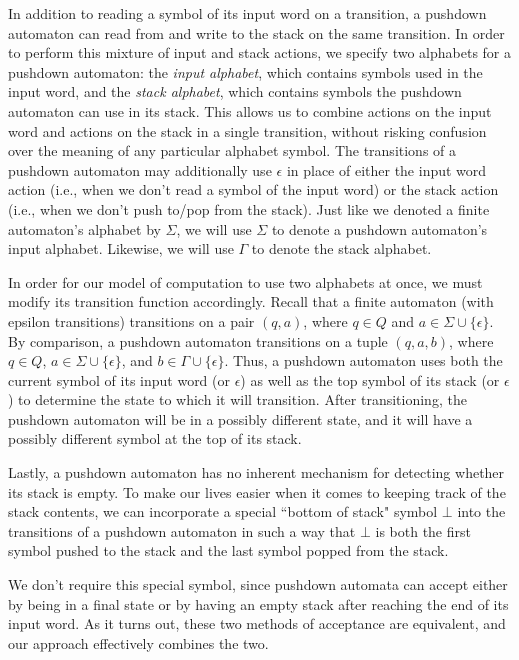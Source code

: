 In addition to reading a symbol of its input word on a transition, a pushdown automaton can read from and write to the stack on the same transition. In order to perform this mixture of input and stack actions, we specify two alphabets for a pushdown automaton: the \emph{input alphabet}, which contains symbols used in the input word, and the \emph{stack alphabet}, which contains symbols the pushdown automaton can use in its stack. This allows us to combine actions on the input word and actions on the stack in a single transition, without risking confusion over the meaning of any particular alphabet symbol. The transitions of a pushdown automaton may additionally use $\epsilon$ in place of either the input word action (i.e., when we don't read a symbol of the input word) or the stack action (i.e., when we don't push to/pop from the stack). Just like we denoted a finite automaton's alphabet by $\Sigma$, we will use $\Sigma$ to denote a pushdown automaton's input alphabet. Likewise, we will use $\Gamma$ to denote the stack alphabet.

In order for our model of computation to use two alphabets at once, we must modify its transition function accordingly. Recall that a finite automaton (with epsilon transitions) transitions on a pair $(q, a)$, where $q \in Q$ and $a \in \Sigma \cup \{\epsilon\}$. By comparison, a pushdown automaton transitions on a tuple $(q, a, b)$, where $q \in Q$, $a \in \Sigma \cup \{\epsilon\}$, and $b \in \Gamma \cup \{\epsilon\}$. Thus, a pushdown automaton uses both the current symbol of its input word (or $\epsilon$) as well as the top symbol of its stack (or $\epsilon$) to determine the state to which it will transition. After transitioning, the pushdown automaton will be in a possibly different state, and it will have a possibly different symbol at the top of its stack.

Lastly, a pushdown automaton has no inherent mechanism for detecting whether its stack is empty. To make our lives easier when it comes to keeping track of the stack contents, we can incorporate a special ``bottom of stack" symbol $\bot$ into the transitions of a pushdown automaton in such a way that $\bot$ is both the first symbol pushed to the stack and the last symbol popped from the stack.

\begin{remark}
We don't require this special symbol, since pushdown automata can accept either by being in a final state or by having an empty stack after reaching the end of its input word. As it turns out, these two methods of acceptance are equivalent, and our approach effectively combines the two.
\end{remark}

